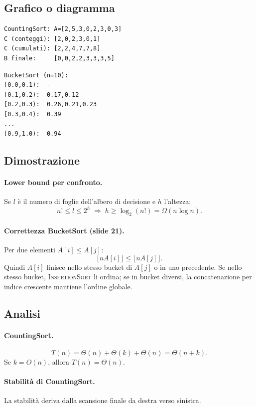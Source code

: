 \subsection{Grafico o diagramma}
\begin{center}
\begin{verbatim}
CountingSort: A=[2,5,3,0,2,3,0,3]
C (conteggi): [2,0,2,3,0,1]
C (cumulati): [2,2,4,7,7,8]
B finale:     [0,0,2,2,3,3,3,5]
\end{verbatim}
\end{center}

\begin{center}
\begin{verbatim}
BucketSort (n=10):
[0.0,0.1):  -
[0.1,0.2):  0.17,0.12
[0.2,0.3):  0.26,0.21,0.23
[0.3,0.4):  0.39
...
[0.9,1.0):  0.94
\end{verbatim}
\end{center}

\subsection{Dimostrazione}
\paragraph{Lower bound per confronto.}
Se $l$ è il numero di foglie dell'albero di decisione e $h$ l'altezza:
\[
n!\le l\le 2^h\;\Rightarrow\;h\ge\log_2(n!)=\Omega(n\log n).
\]

\paragraph{Correttezza BucketSort (slide 21).}
Per due elementi $A[i]\le A[j]$:
\[
\lfloor nA[i]\rfloor\le\lfloor nA[j]\rfloor.
\]
Quindi $A[i]$ finisce nello stesso bucket di $A[j]$ o in uno precedente.
Se nello stesso bucket, \textsc{InsertionSort} li ordina; se in bucket diversi, la concatenazione per indice crescente mantiene l'ordine globale.

\subsection{Analisi}
\paragraph{CountingSort.}
\[
T(n)=\Theta(n)+\Theta(k)+\Theta(n)=\Theta(n+k).
\]
Se $k=O(n)$, allora $T(n)=\Theta(n)$.

\paragraph{Stabilità di CountingSort.}
La stabilità deriva dalla scansione finale da destra verso sinistra.

